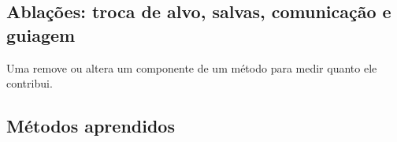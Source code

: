 \subsection{Ablações: troca de alvo, salvas, comunicação e guiagem}\label{sec:res_ablacao}
Uma  remove ou altera um componente de um método para medir quanto ele contribui.


\subsection{Métodos aprendidos}\label{sec:res_redes}
